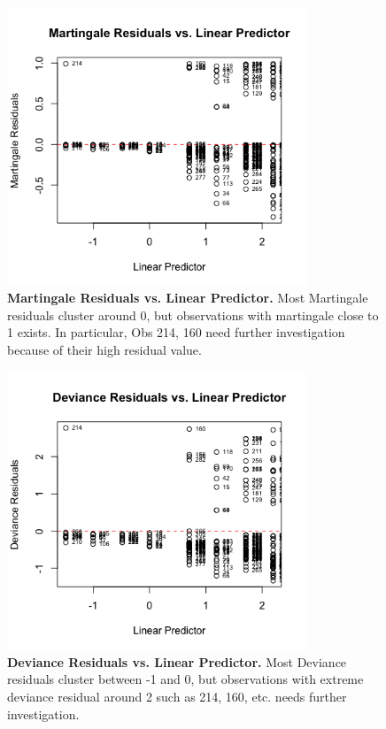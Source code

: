 \documentclass[12pt]{article}
\begin{document}
\begin{figure}[H]
    \centering
    \includegraphics[width=0.8\textwidth]{plots/martingale.png}
    \caption{\textbf{Martingale Residuals vs. Linear Predictor.} Most Martingale residuals cluster around 0, but observations with martingale close to 1 exists. In particular, Obs 214, 160 need further investigation because of their high residual value. }
    \label{fig:km_na_curves}
\end{figure}

\begin{figure}[H]
    \centering
    \includegraphics[width=0.8\textwidth]{plots/deviance.png}
    \caption{\textbf{Deviance Residuals vs. Linear Predictor.} Most Deviance residuals cluster between -1 and 0, but observations with extreme deviance residual around 2 such as 214, 160, etc. needs further investigation. }    
    \label{fig:km_na_curves}
\end{figure}
\end{document}
